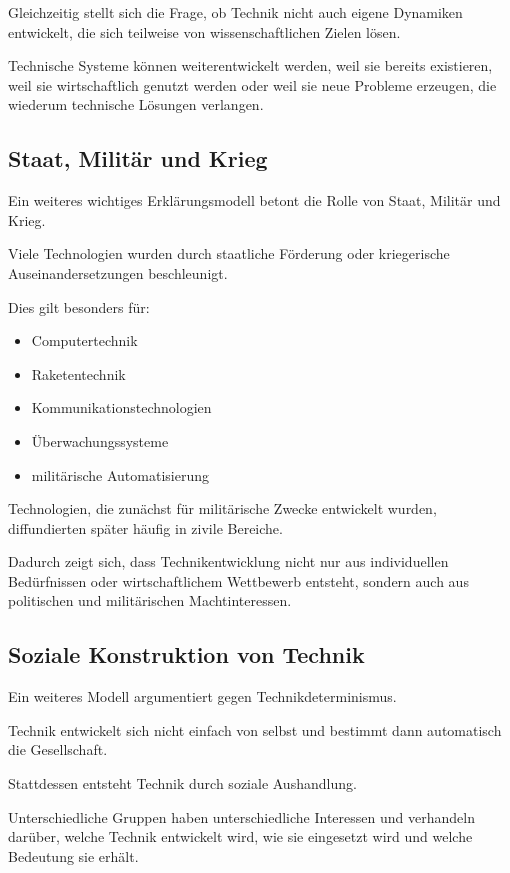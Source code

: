 Gleichzeitig stellt sich die Frage,
ob Technik nicht auch eigene Dynamiken entwickelt,
die sich teilweise von wissenschaftlichen Zielen lösen.

Technische Systeme können weiterentwickelt werden,
weil sie bereits existieren,
weil sie wirtschaftlich genutzt werden
oder weil sie neue Probleme erzeugen,
die wiederum technische Lösungen verlangen.

\subsection{Staat, Militär und Krieg}

Ein weiteres wichtiges Erklärungsmodell
betont die Rolle von Staat,
Militär und Krieg.

Viele Technologien wurden durch staatliche Förderung
oder kriegerische Auseinandersetzungen beschleunigt.

Dies gilt besonders für:

\begin{itemize}
\item Computertechnik
\item Raketentechnik
\item Kommunikationstechnologien
\item Überwachungssysteme
\item militärische Automatisierung
\end{itemize}

Technologien,
die zunächst für militärische Zwecke entwickelt wurden,
diffundierten später häufig in zivile Bereiche.

Dadurch zeigt sich,
dass Technikentwicklung nicht nur
aus individuellen Bedürfnissen
oder wirtschaftlichem Wettbewerb entsteht,
sondern auch aus politischen
und militärischen Machtinteressen.

\subsection{Soziale Konstruktion von Technik}

Ein weiteres Modell argumentiert gegen Technikdeterminismus.

Technik entwickelt sich nicht einfach von selbst
und bestimmt dann automatisch die Gesellschaft.

Stattdessen entsteht Technik
durch soziale Aushandlung.

Unterschiedliche Gruppen haben unterschiedliche Interessen
und verhandeln darüber,
welche Technik entwickelt wird,
wie sie eingesetzt wird
und welche Bedeutung sie erhält.

